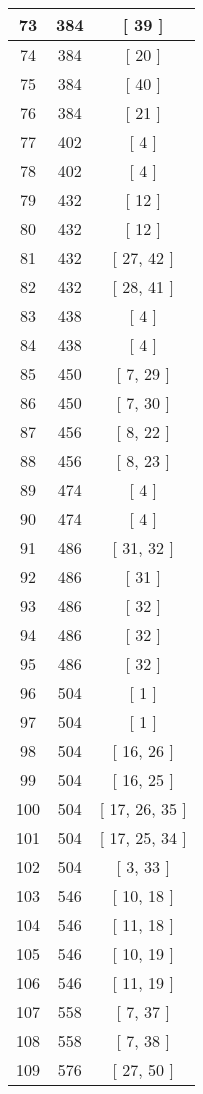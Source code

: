 \begin{center}
\begin{longtable}[H]{|| c c c ||}
\hline
73 & 384 & [ 39 ] \\ 
\hline
74 & 384 & [ 20 ] \\ 
\hline
75 & 384 & [ 40 ] \\ 
\hline
76 & 384 & [ 21 ] \\ 
\hline
77 & 402 & [ 4 ] \\ 
\hline
78 & 402 & [ 4 ] \\ 
\hline
79 & 432 & [ 12 ] \\ 
\hline
80 & 432 & [ 12 ] \\ 
\hline
81 & 432 & [ 27, 42 ] \\ 
\hline
82 & 432 & [ 28, 41 ] \\ 
\hline
83 & 438 & [ 4 ] \\ 
\hline
84 & 438 & [ 4 ] \\ 
\hline
85 & 450 & [ 7, 29 ] \\ 
\hline
86 & 450 & [ 7, 30 ] \\ 
\hline
87 & 456 & [ 8, 22 ] \\ 
\hline
88 & 456 & [ 8, 23 ] \\ 
\hline
89 & 474 & [ 4 ] \\ 
\hline
90 & 474 & [ 4 ] \\ 
\hline
91 & 486 & [ 31, 32 ] \\ 
\hline
92 & 486 & [ 31 ] \\ 
\hline
93 & 486 & [ 32 ] \\ 
\hline
94 & 486 & [ 32 ] \\ 
\hline
95 & 486 & [ 32 ] \\ 
\hline
96 & 504 & [ 1 ] \\ 
\hline
97 & 504 & [ 1 ] \\ 
\hline
98 & 504 & [ 16, 26 ] \\ 
\hline
99 & 504 & [ 16, 25 ] \\ 
\hline
100 & 504 & [ 17, 26, 35 ] \\ 
\hline
101 & 504 & [ 17, 25, 34 ] \\ 
\hline
102 & 504 & [ 3, 33 ] \\ 
\hline
103 & 546 & [ 10, 18 ] \\ 
\hline
104 & 546 & [ 11, 18 ] \\ 
\hline
105 & 546 & [ 10, 19 ] \\ 
\hline
106 & 546 & [ 11, 19 ] \\ 
\hline
107 & 558 & [ 7, 37 ] \\ 
\hline
108 & 558 & [ 7, 38 ] \\ 
\hline
109 & 576 & [ 27, 50 ] \\ 

\end{longtable}
\end{center}
